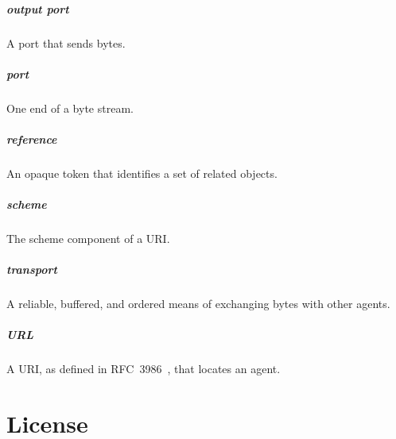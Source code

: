 \documentclass[letterpaper,12pt,openany]{report}
\newcommand{\GlossaryItem}[2]{
  \paragraph{#1} #2\vspace{-1ex}
}
\begin{document}
\GlossaryItem{output port}{A port that sends bytes.}

\GlossaryItem{port}{One end of a byte stream.}

\GlossaryItem{reference}{An opaque token that identifies a set of related
  objects.}

\GlossaryItem{scheme}{The scheme component of a URI.}

\GlossaryItem{transport}{A reliable, buffered, and ordered means of exchanging
  bytes with other agents.}

\GlossaryItem{URL}{A URI, as defined in RFC~3986~\cite{berners2014rfc}, that
  locates an agent.}



 
\label{cha:references}

\chapter{License}
\label{cha:license}

\end{document}
